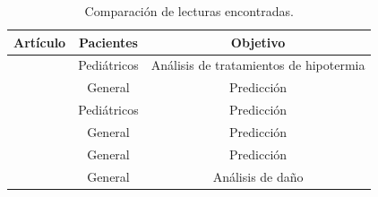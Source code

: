 \begin{table}[h]
	\centering
	\caption[Estado del arte]{Comparación de lecturas encontradas.}
	\begin{tabular}{l c c}    
		\toprule
		\textbf{Artículo} 	 & \textbf{Pacientes} 		& \textbf{Objetivo}  \\
		\midrule
		\citep{jcm12062095} & Pediátricos 				&  Análisis de tratamientos de hipotermia\\		
		\citep{jcm12134434}   & General				& Predicción \\
		\citep{10.3389/fphys.2022.921884} & Pediátricos 				&  Predicción\\		
		\citep{10125880} & General				& Predicción \\
		\citep{doi:10.1177/09544119241266375} 	 & General				& Predicción \\
		\citep{SHAMMI2022107013} & General				& Análisis de daño \\
		\bottomrule
		\hline
	\end{tabular}
	\label{tab:estado_del_arte}
\end{table}

